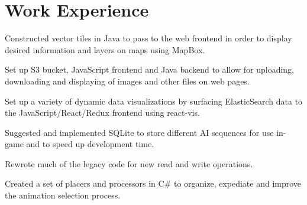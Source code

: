 \documentclass[letterpaper]{deedy-resume-modified} %
\begin{document}
\hfill
%
%
\begin{minipage}[t]{0.70\textwidth} %
\vspace{5pt}

\section{Work Experience}


\vspace{\topsep}
\begin{tightitemize}
\item Constructed vector tiles in Java to pass to the web frontend in order to display desired information and layers on maps using MapBox.
\item Set up S3 bucket, JavaScript frontend and Java backend to allow for uploading, downloading and displaying of images and other files on web pages.
\item Set up a variety of dynamic data visualizations by surfacing ElasticSearch data to the JavaScript/React/Redux frontend using react-vis.
\end{tightitemize}

\sectionspace %

\vspace{\topsep}
\begin{tightitemize}
\vspace{-10pt}
\item Suggested and implemented SQLite to store different AI sequences for use in-game and to speed up development time.  
\item Rewrote much of the legacy \CPP \hspace{1pt}code for new read and write operations.
\item Created a set of placers and processors in C\# to organize, expediate and improve the animation selection process.
\end{tightitemize}


\end{minipage}
\end{document}
